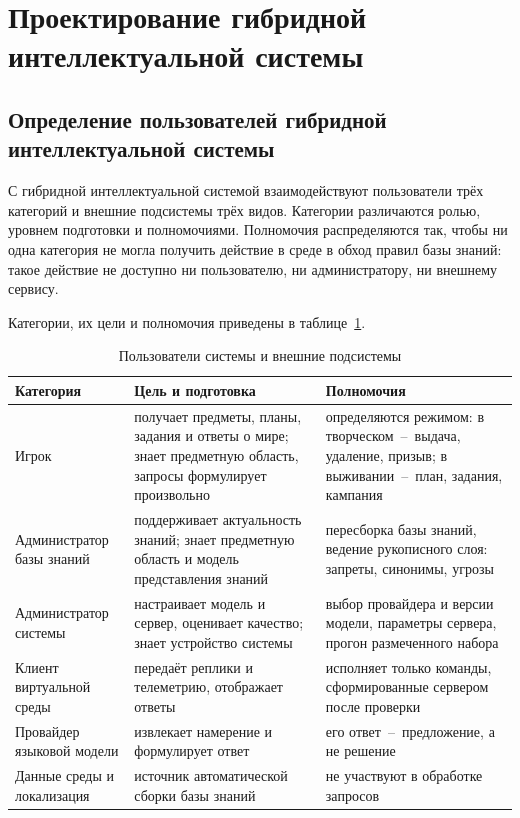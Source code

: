 \section{Проектирование гибридной интеллектуальной системы}

\subsection{Определение пользователей гибридной интеллектуальной системы}

С гибридной интеллектуальной системой взаимодействуют пользователи трёх категорий
и внешние подсистемы трёх видов. Категории различаются ролью, уровнем подготовки и
полномочиями. Полномочия распределяются так, чтобы ни одна категория не могла
получить действие в среде в обход правил базы знаний: такое действие не доступно
ни пользователю, ни администратору, ни внешнему сервису.

Категории, их цели и полномочия приведены в таблице~\ref{tab:users}.

\begin{table}[!htb]
  \centering
  \caption{Пользователи системы и внешние подсистемы}
  \label{tab:users}
  \begin{tabular}{|>{\raggedright\arraybackslash}p{}
                  |>{\raggedright\arraybackslash}p{}
                  |>{\raggedright\arraybackslash}p{}|}
    \hline
    Категория & Цель и подготовка & Полномочия \\
    \hline
    Игрок & получает предметы, планы, задания и ответы о мире; знает предметную область, запросы формулирует произвольно & определяются режимом: в творческом~--~выдача, удаление, призыв; в выживании~--~план, задания, кампания \\
    \hline
    Администратор базы знаний & поддерживает актуальность знаний; знает предметную область и модель представления знаний & пересборка базы знаний, ведение рукописного слоя: запреты, синонимы, угрозы \\
    \hline
    Администратор системы & настраивает модель и сервер, оценивает качество; знает устройство системы & выбор провайдера и версии модели, параметры сервера, прогон размеченного набора \\
    \hline
    Клиент виртуальной среды & передаёт реплики и телеметрию, отображает ответы & исполняет только команды, сформированные сервером после проверки \\
    \hline
    Провайдер языковой модели & извлекает намерение и формулирует ответ & его ответ~--~предложение, а не решение \\
    \hline
    Данные среды и локализация & источник автоматической сборки базы знаний & не участвуют в обработке запросов \\
    \hline
  \end{tabular}
\end{table}

